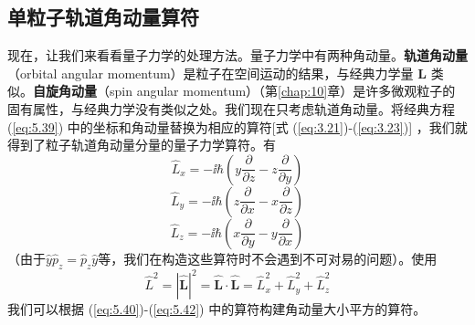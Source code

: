 \subsection*{单粒子轨道角动量算符}
    现在，让我们来看看量子力学的处理方法。量子力学中有两种角动量。\textbf{轨道角动量}（orbital angular momentum）是粒子在空间运动的结果，与经典力学量 $\mathbf{L}$ 类似。\textbf{自旋角动量}（spin angular momentum）（第\ref{chap:10}章）是许多微观粒子的固有属性，与经典力学没有类似之处。我们现在只考虑轨道角动量。将经典方程(\ref{eq:5.39}) 中的坐标和角动量替换为相应的算符[式 (\ref{eq:3.21})-(\ref{eq:3.23})] ，我们就得到了粒子轨道角动量分量的量子力学算符。有
    \begin{equation}
        \hat{L}_x = -\ii \hbar\left(y\frac{\partial}{\partial z} - z\frac{\partial}{\partial y}\right)
        \label{eq:5.40}
    \end{equation}
    \begin{equation}
        \hat{L}_y = -\ii \hbar\left(z\frac{\partial}{\partial x} - x\frac{\partial}{\partial z}\right)
        \label{eq:5.41}
    \end{equation}
    \begin{equation}
        \hat{L}_z = -\ii \hbar\left(x\frac{\partial}{\partial y} - y\frac{\partial}{\partial x}\right)
        \label{eq:5.42}
    \end{equation}
    （由于$\hat{y}\hat{p}_z = \hat{p}_z\hat{y}$等，我们在构造这些算符时不会遇到不可对易的问题）。使用
    \begin{equation}
        \hat{L}^2 = \left|\hat{\mathbf{L}}\right|^2 = \hat{\mathbf{L}}\cdot\hat{\mathbf{L}} = \hat{L}_x^2 + \hat{L}_y^2 + \hat{L}_z^2
        \label{eq:5.43}
    \end{equation}
    我们可以根据 (\ref{eq:5.40})-(\ref{eq:5.42}) 中的算符构建角动量大小平方的算符。

